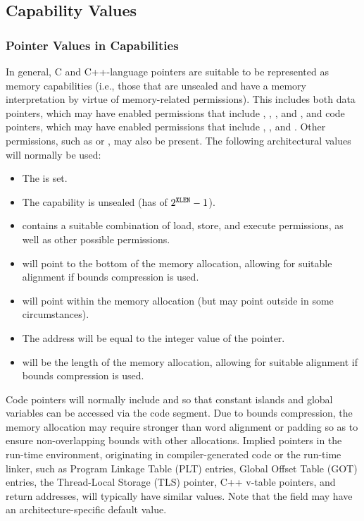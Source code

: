 \subsection{Capability Values}

\subsubsection{Pointer Values in Capabilities}

In general, C and C++-language pointers are suitable to be represented as
memory capabilities (i.e., those that are unsealed and have a memory
interpretation by virtue of memory-related permissions).
This includes both data pointers, which may have enabled permissions that
include \cappermL, \cappermS, \cappermLC, and
\cappermSC, and code pointers, which may have enabled
permissions that include \cappermL, \cappermX, and
\cappermLC.
Other permissions, such as \cappermG or \cappermInvoke, may also be present.
The following architectural values will normally be used:

\begin{itemize}
\item The \ctag{} is set.
\item The capability is unsealed (has \cotype{} of $2^{{\texttt{XLEN}}{}}-1$).
\item \cperms{} contains a suitable combination of load, store, and
  execute permissions, as well as other possible permissions.
\item \cbase{} will point to the bottom of the memory allocation, allowing for
  suitable alignment if bounds compression is used.
\item \coffset{} will point within the memory allocation (but may point
  outside in some circumstances).
\item The address will be equal to the integer value of the pointer.
\item \clength{} will be the length of the memory allocation, allowing for
  suitable alignment if bounds compression is used.
\end{itemize}

Code pointers will normally include \cappermL and \cappermLC
so that constant islands and global variables can be accessed via the code
segment.
Due to bounds compression, the memory allocation may require stronger than
word alignment or padding so as to ensure non-overlapping bounds with other
allocations.
Implied pointers in the run-time environment, originating in
compiler-generated code or the run-time linker, such as Program Linkage Table
(PLT) entries, Global Offset Table (GOT) entries, the Thread-Local Storage
(TLS) pointer, C++ v-table pointers, and return addresses, will typically have
similar values.
Note that the \cflags{} field may have an architecture-specific default value.

